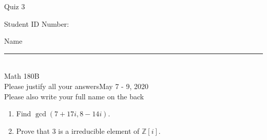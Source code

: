 \documentclass[12pt]{article}
\newcommand{\integers}{\mathbb{Z}}
\begin{document}
\begin{flushleft} 
\centerline{\LARGE{Quiz 3}} 
\vspace{5 mm}
{Student ID Number:}\hfill  
{Name \rule {2 in}{0.01in}}\\
Math 180B
\\
{Please justify all your answers}\hfill {May 7 - 9, 2020}
\\
{Please also write your full name on the back} 

\medskip
\end{flushleft}

\begin{enumerate}
	\item Find $\gcd(7+17i, 8-14i)$.
	\vfill

	\item Prove that 3 is a irreducible element of $\integers[i]$.
	\vfill
\end{enumerate}
\end{document}
